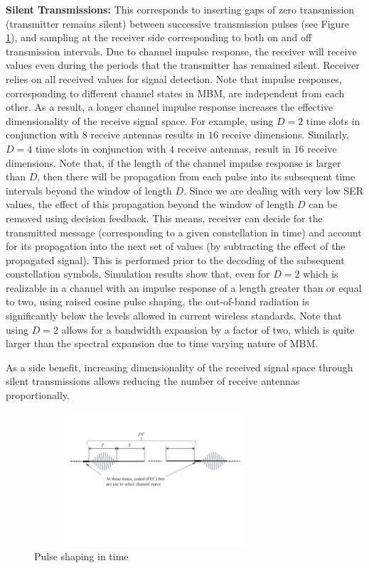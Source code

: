 \textbf{Silent Transmissions:} This corresponds to inserting gaps of zero transmission (transmitter remains silent) between successive transmission pulses (see Figure \ref{pulse shaping}), and sampling at the receiver side corresponding to both on and off transmission intervals. Due to channel impulse response, the receiver will receive values even during the periods that the transmitter has remained silent. Receiver relies on all received values for signal detection. Note that impulse responses, corresponding to different channel states in MBM, are independent from each other. As a result, a longer channel impulse response increases the effective dimensionality of the receive signal space. For example, using $D = 2$ time slots in conjunction with $8$ receive antennas results in $16$ receive dimensions. Similarly, $D = 4$ time slots in conjunction with $4$ receive antennas, result in $16$ receive dimensions. Note that, if the length of the channel impulse response is larger than $D$, then there will be propagation from each pulse into its subsequent time intervals beyond the window of length $D$. Since we are dealing with very low SER values, the effect of this propagation beyond the window of length $D$ can be removed using decision feedback. This means, receiver can decide for the transmitted message (corresponding to a given constellation in time) and account for its propagation into the next set of values (by subtracting the effect of the propagated signal). This is performed prior to the decoding of the subsequent constellation symbols. Simulation results show that, even for $D = 2$ which is realizable in a channel with an impulse response of a length greater than or equal to two, using raised cosine pulse shaping, the out-of-band radiation is significantly below the levels allowed in current wireless standards. Note that using $D = 2$ allows for a bandwidth expansion by a factor of two, which is quite larger than the spectral expansion due to time varying nature of MBM. 

As a side benefit, increasing dimensionality of the received signal space through silent transmissions allows reducing the number of receive antennas proportionally.  


\begin{figure}[t]
\centering
\hspace{1cm}
\includegraphics[height = 5cm, width = 9cm, trim = 0 8cm 0 0cm]{./fig/pulseShaping}
\caption{Pulse shaping in time}
\label{pulse shaping}
\end{figure}

